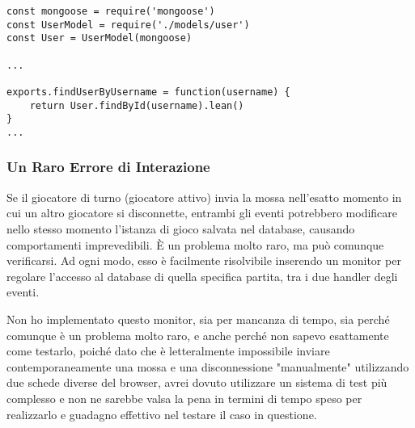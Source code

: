 \begin{lstlisting}
const mongoose = require('mongoose')
const UserModel = require('./models/user')
const User = UserModel(mongoose)

...

exports.findUserByUsername = function(username) {
	return User.findById(username).lean()
}
...
\end{lstlisting}

\newpage

\subsubsection{Un Raro Errore di Interazione}

Se il giocatore di turno (giocatore attivo) invia la mossa nell'esatto momento in cui un altro giocatore si disconnette, entrambi gli eventi potrebbero modificare nello stesso momento l'istanza di gioco salvata nel database, causando comportamenti imprevedibili. È un problema molto raro, ma può comunque verificarsi. Ad ogni modo, esso è facilmente risolvibile inserendo un monitor per regolare l'accesso al database di quella specifica partita, tra i due handler degli eventi.

Non ho implementato questo monitor, sia per mancanza di tempo, sia perché comunque è un problema molto raro, e anche perché non sapevo esattamente come testarlo, poiché dato che è letteralmente impossibile inviare contemporaneamente una mossa e una disconnessione "manualmente" utilizzando due schede diverse del browser, avrei dovuto utilizzare un sistema di test più complesso e non ne sarebbe valsa la pena in termini di tempo speso per realizzarlo e guadagno effettivo nel testare il caso in questione.

\newpage
